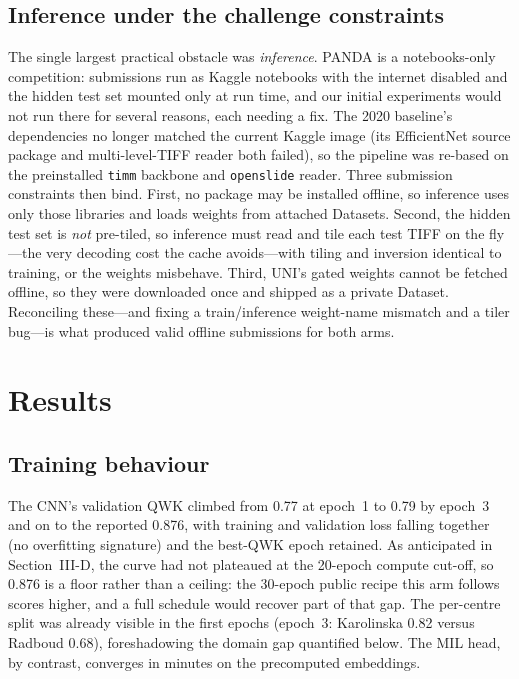 \documentclass[conference]{IEEEtran}
\begin{document}
\subsection{Inference under the challenge constraints}
The single largest practical obstacle was \emph{inference}. PANDA is a
notebooks-only competition: submissions run as Kaggle notebooks with the internet
disabled and the hidden test set mounted only at run time, and our initial
experiments would not run there for several reasons, each needing a fix. The 2020
baseline's dependencies no longer matched the current Kaggle image (its EfficientNet
source package and multi-level-TIFF reader both failed), so the pipeline was
re-based on the preinstalled \texttt{timm} backbone and \texttt{openslide} reader.
Three submission constraints then bind. First, no package may be installed offline,
so inference uses only those libraries and loads weights from attached Datasets.
Second, the hidden test set is \emph{not} pre-tiled, so inference must read and tile
each test TIFF on the fly---the very decoding cost the cache avoids---with tiling and
inversion identical to training, or the weights misbehave. Third, UNI's gated weights
cannot be fetched offline, so they were downloaded once and shipped as a private
Dataset. Reconciling these---and fixing a train/inference weight-name mismatch and a
tiler bug---is what produced valid offline submissions for both arms.

\section{Results}

\subsection{Training behaviour}
The CNN's validation QWK climbed from 0.77 at epoch~1 to 0.79 by epoch~3 and on to
the reported 0.876, with training and validation loss falling together (no
overfitting signature) and the best-QWK epoch retained. As anticipated in
Section~III-D, the curve had not plateaued at the 20-epoch compute cut-off, so
0.876 is a floor rather than a ceiling: the 30-epoch public recipe this arm follows
scores higher, and a full schedule would recover part of that gap. The per-centre
split was already visible in the first epochs (epoch~3: Karolinska 0.82 versus
Radboud 0.68), foreshadowing the domain gap quantified below. The MIL head, by
contrast, converges in minutes on the precomputed embeddings.
\end{document}

